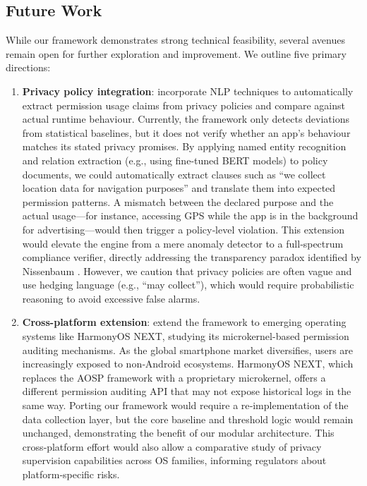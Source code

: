 \subsection{Future Work}
While our framework demonstrates strong technical feasibility, several avenues remain open for further exploration and improvement. We outline five primary directions:

\begin{enumerate}
\item \textbf{Privacy policy integration}: incorporate NLP techniques to automatically extract permission usage claims from privacy policies and compare against actual runtime behaviour. Currently, the framework only detects deviations from statistical baselines, but it does not verify whether an app's behaviour matches its stated privacy promises. By applying named entity recognition and relation extraction (e.g., using fine‑tuned BERT models) to policy documents, we could automatically extract clauses such as ``we collect location data for navigation purposes'' and translate them into expected permission patterns. A mismatch between the declared purpose and the actual usage—for instance, accessing GPS while the app is in the background for advertising—would then trigger a policy‑level violation. This extension would elevate the engine from a mere anomaly detector to a full‑spectrum compliance verifier, directly addressing the transparency paradox identified by Nissenbaum \cite{5}. However, we caution that privacy policies are often vague and use hedging language (e.g., ``may collect''), which would require probabilistic reasoning to avoid excessive false alarms.

\item \textbf{Cross-platform extension}: extend the framework to emerging operating systems like HarmonyOS NEXT, studying its microkernel-based permission auditing mechanisms. As the global smartphone market diversifies, users are increasingly exposed to non‑Android ecosystems. HarmonyOS NEXT, which replaces the AOSP framework with a proprietary microkernel, offers a different permission auditing API that may not expose historical logs in the same way. Porting our framework would require a re‑implementation of the data collection layer, but the core baseline and threshold logic would remain unchanged, demonstrating the benefit of our modular architecture. This cross‑platform effort would also allow a comparative study of privacy supervision capabilities across OS families, informing regulators about platform‑specific risks.


\end{enumerate}
